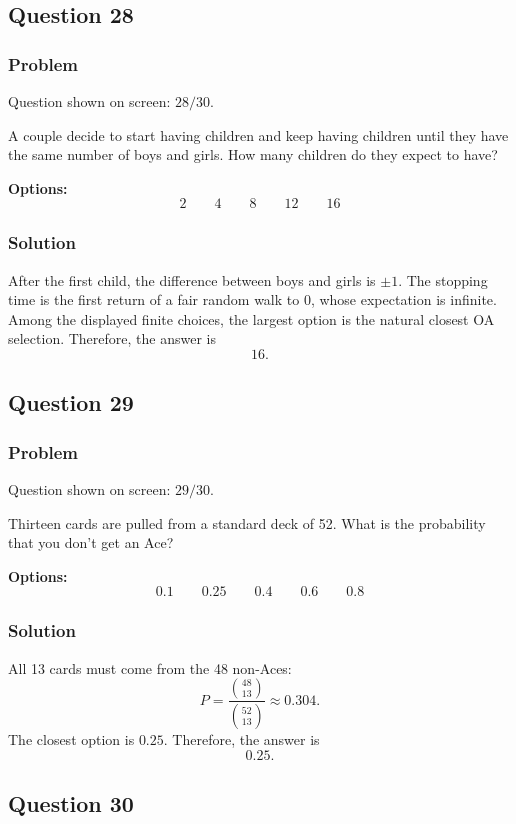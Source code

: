\documentclass[12pt]{article}
\begin{document}
\subsection{Question 28}
\subsubsection{Problem}
Question shown on screen: \(28/30\).

A couple decide to start having children and keep having children until they have the same number of boys and girls. How many children do they expect to have?

\noindent\textbf{Options:}
\[
\boxed{2}
\qquad
\boxed{4}
\qquad
\boxed{8}
\qquad
\boxed{12}
\qquad
\boxed{16}
\]

\subsubsection{Solution}
After the first child, the difference between boys and girls is \(\pm 1\). The stopping time is the first return of a fair random walk to \(0\), whose expectation is infinite. Among the displayed finite choices, the largest option is the natural closest OA selection. Therefore, the answer is
\[
\boxed{16}.
\]

\subsection{Question 29}
\subsubsection{Problem}
Question shown on screen: \(29/30\).

Thirteen cards are pulled from a standard deck of 52. What is the probability that you don't get an Ace?

\noindent\textbf{Options:}
\[
\boxed{0.1}
\qquad
\boxed{0.25}
\qquad
\boxed{0.4}
\qquad
\boxed{0.6}
\qquad
\boxed{0.8}
\]

\subsubsection{Solution}
All 13 cards must come from the 48 non-Aces:
\[
P=\frac{\binom{48}{13}}{\binom{52}{13}}\approx 0.304.
\]
The closest option is \(0.25\). Therefore, the answer is
\[
\boxed{0.25}.
\]

\subsection{Question 30}
\end{document}
